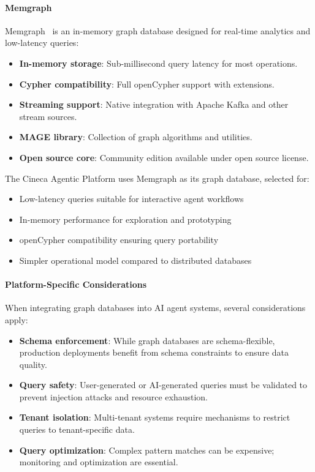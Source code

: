 \paragraph{Memgraph}

Memgraph~%
is an in-memory graph database designed for real-time analytics and low-latency queries:
\begin{itemize}
    \item \textbf{In-memory storage}: Sub-millisecond query latency for most operations.
    \item \textbf{Cypher compatibility}: Full openCypher support with extensions.
    \item \textbf{Streaming support}: Native integration with Apache Kafka and other stream sources.
    \item \textbf{MAGE library}: Collection of graph algorithms and utilities.
    \item \textbf{Open source core}: Community edition available under open source license.
\end{itemize}

The Cineca Agentic Platform uses Memgraph as its graph database, selected for:
\begin{itemize}
    \item Low-latency queries suitable for interactive agent workflows
    \item In-memory performance for exploration and prototyping
    \item openCypher compatibility ensuring query portability
    \item Simpler operational model compared to distributed databases
\end{itemize}

\paragraph{Platform-Specific Considerations}

When integrating graph databases into AI agent systems, several considerations apply:

\begin{itemize}
    \item \textbf{Schema enforcement}: While graph databases are schema-flexible, production deployments benefit from schema constraints to ensure data quality.
    
    \item \textbf{Query safety}: User-generated or AI-generated queries must be validated to prevent injection attacks and resource exhaustion.
    
    \item \textbf{Tenant isolation}: Multi-tenant systems require mechanisms to restrict queries to tenant-specific data.
    
    \item \textbf{Query optimization}: Complex pattern matches can be expensive; monitoring and optimization are essential.
\end{itemize}


